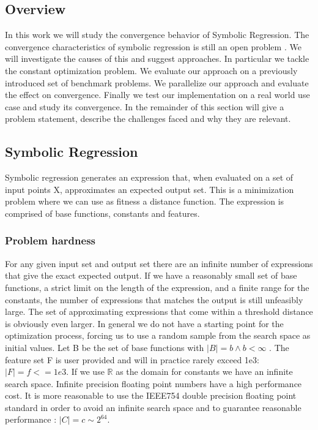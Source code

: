 \subsection{Overview}
In this work we will study the convergence behavior of Symbolic Regression. The convergence characteristics of symbolic regression is still an open problem \cite{SRBaseline, SRAccur, SRAccuracy, FFX}. We will investigate the causes of this and suggest approaches. In particular we tackle the constant optimization problem. We evaluate our approach on a previously introduced \cite{SRBaseline} set of benchmark problems. We parallelize our approach and evaluate the effect on convergence. Finally we test our implementation on a real world use case and study its convergence.
In the remainder of this section will give a problem statement, describe the challenges faced and why they are relevant.

\subsection{Symbolic Regression}
Symbolic regression generates an expression that, when evaluated on a set of input points X, approximates an expected output set. This is a minimization problem where we can use as fitness a distance function. The expression is comprised of base functions, constants and features. 

\subsubsection{Problem hardness}
For any given input set and output set there are an infinite number of expressions that give the exact expected output. If we have a reasonably small set of base functions, a strict limit on the length of the expression, and a finite range for the constants, the number of expressions that matches the output is still unfeasibly large. The set of approximating expressions that come within a threshold distance is obviously even larger. In general we do not have a starting point for the optimization process, forcing us to use a random sample from the search space as initial values.
Let B be the set of base functions with $\vert B \vert = b \land b < \infty$ . The feature set F is user provided and will in practice rarely exceed 1e3: $\vert F \vert = f <= 1e3$. 
If we use $\mathbb{R}$ as the domain for constants we have an infinite search space. Infinite precision floating point numbers have a high performance cost. It is more reasonable to use the IEEE754  double precision floating point standard in order to avoid an infinite search space and to guarantee reasonable performance :  $\vert C \vert = c \sim 2^{64}$.

